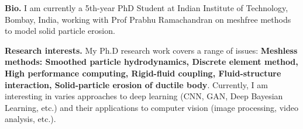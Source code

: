 %
%

\par{
{\textbf{Bio.}}
I am currently a 5th-year PhD Student at Indian Institute of Technology, Bombay, India,
 working with Prof Prabhu Ramachandran on meshfree methods to model solid particle erosion.

 {\textbf{Research interests.}} My Ph.D research work covers a range of issues:
 \textbf{Meshless methods: Smoothed particle hydrodynamics, Discrete element
   method, High performance computing, Rigid-fluid coupling, Fluid-structure
   interaction, Solid-particle erosion of ductile body}. Currently, I am interesting in varies
 approaches to deep learning (CNN, GAN, Deep Bayesian Learning, etc.) and their
 applications to computer vision (image processing, video analysis, etc.). }
